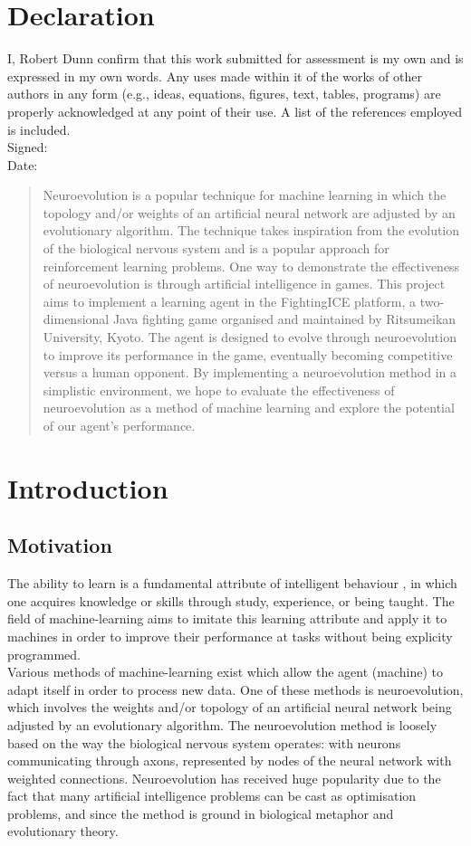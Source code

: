\documentclass[11pt,a4paper]{article}
\begin{document}
\section*{Declaration}
I,  Robert Dunn confirm that this work submitted for assessment is my own and is expressed
in my own words. Any uses made within it of the works of other authors in any
form (e.g., ideas, equations, figures, text, tables, programs) are properly acknowledged
at any point of their use. A list of the references employed is included.\\
Signed:\\
Date: 
\newpage
\thispagestyle{empty}
\begin{abstract}
Neuroevolution is a popular technique for machine learning in which the topology and/or weights of an artificial neural network are adjusted by an evolutionary algorithm. The technique takes inspiration from the evolution of the biological nervous system and is a popular approach for reinforcement learning problems. One way to demonstrate the effectiveness of neuroevolution is through artificial intelligence in games. This project aims to implement a learning agent in the FightingICE platform, a two-dimensional Java fighting game organised and maintained by Ritsumeikan University, Kyoto. The agent is designed to evolve through neuroevolution to improve its performance in the game, eventually becoming competitive versus a human opponent. By implementing a neuroevolution method in a simplistic environment, we hope to evaluate the effectiveness of neuroevolution as a method of machine learning and explore the potential of our agent's performance.
\end{abstract}
\newpage
\thispagestyle{empty}
\tableofcontents
\newpage
\section{Introduction}
\subsection{Motivation}
The ability to learn is a fundamental attribute of intelligent behaviour \cite{michalski}, in which one acquires knowledge or skills through study, experience, or being taught. The field of machine-learning aims to imitate this learning attribute and apply it to machines in order to improve their performance at tasks without being explicity programmed.\\

Various methods of machine-learning exist which allow the agent (machine) to adapt itself in order to process new data. One of these methods is neuroevolution, which involves the weights and/or topology of an artificial neural network being adjusted by an evolutionary algorithm. The neuroevolution method is loosely based on the way the biological nervous system operates: with neurons communicating through axons, represented by nodes of the neural network with weighted connections. Neuroevolution has received huge popularity due to the fact that many artificial intelligence problems can be cast as optimisation problems, and since the method is ground in biological metaphor and evolutionary theory. \cite{risi}\\
\end{document}
